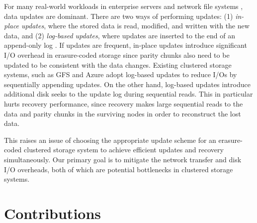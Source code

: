 For many real-world workloads in enterprise servers and network file systems
\cite{adams12,narayanan08}, data updates are dominant.  There are two ways of
performing updates: (1) {\em in-place updates}, where the stored data is read,
modified, and written with the new data, and (2) {\em log-based updates},
where updates are inserted to the end of an append-only log
\cite{rosenblum92}.  If updates are frequent, in-place updates introduce
significant I/O overhead in erasure-coded storage since parity chunks also
need to be updated to be consistent with the data changes.  Existing
clustered storage systems, such as GFS \cite{ghemawat03} and Azure 
\cite{calder11} adopt log-based updates to reduce I/Os by sequentially
appending updates.  On the other hand, log-based updates introduce additional
disk seeks to the update log during sequential reads.  This in particular
hurts recovery performance, since recovery makes large sequential reads to the
data and parity chunks in the surviving nodes in order to reconstruct the lost
data. 

This raises an issue of choosing the appropriate update scheme for an
erasure-coded clustered storage system to achieve efficient updates and
recovery simultaneously.  Our primary goal is to mitigate the network transfer
and disk I/O overheads, both of which are potential bottlenecks in clustered
storage systems. 



\section{Contributions}

